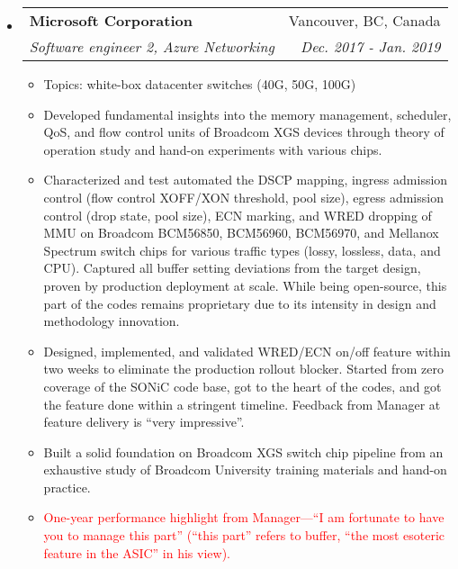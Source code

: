 \documentclass[letterpaper,11pt]{article}
\makeatletter
\newcommand{\ressubheading}[4]{
\begin{tabular*}{6.69in}{l@{\extracolsep{\fill}}r}
        \textbf{#1} & #2 \\
        \textit{#3} & \textit{#4} \\
\end{tabular*}\vspace{-6pt}
}
\newcommand{\resitem}[1]{\item #1 \vspace{-2pt}}
\makeatother
\begin{document}
\begin{itemize}
\item
  \ressubheading{Microsoft Corporation}{Vancouver, BC, Canada}
  {Software engineer 2, Azure Networking}{Dec. 2017 - Jan. 2019}
  \begin{itemize}
  \resitem{Topics: white-box datacenter switches (40G, 50G, 100G)}
  \resitem{Developed fundamental insights into the memory management, scheduler, QoS, and flow control units of Broadcom XGS devices
  through theory of operation study and hand-on experiments with various chips.}
  \resitem{Characterized and test automated the DSCP mapping, ingress admission control (flow control XOFF/XON threshold, pool size),
  egress admission control (drop state, pool size), ECN marking, and WRED dropping of MMU
  on Broadcom BCM56850, BCM56960, BCM56970, and Mellanox Spectrum switch chips
  for various traffic types (lossy, lossless, data, and CPU).
  Captured all buffer setting deviations from the target design, proven by production deployment at scale.
  While being open-source, this part of the codes remains proprietary due to its intensity in design and methodology innovation.}
  \resitem{Designed, implemented, and validated WRED/ECN on/off feature within two weeks to eliminate the production rollout blocker.
  Started from zero coverage of the SONiC code base, got to the heart of the codes, and got the feature done within a stringent timeline.
  Feedback from Manager at feature delivery is ``very impressive''.}
  \resitem{Built a solid foundation on Broadcom XGS switch chip pipeline from an exhaustive study of Broadcom University training materials
  and hand-on practice.}
  \resitem{\textcolor{Red}{One-year performance highlight from Manager---``I am fortunate to have you to manage this part''
  (``this part'' refers to buffer, ``the most esoteric feature in the ASIC'' in his view).}}
  \end{itemize}


\end{itemize}
\end{document}
